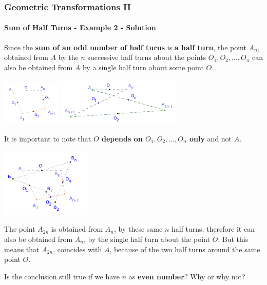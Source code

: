 \documentclass[8pt,xcolor=table,dvipsnames]{beamer}
\begin{document}
\begin{frame}[t]
    \frametitle{Geometric Transformations II}
    \framesubtitle{Sum of Half Turns - Example 2 - Solution}
    Since the \textbf{sum of an odd number of half turns} is \textbf{a half turn}, the point $A_n$, obtained from $A$ by the $n$
    successive half turns about the points $O_1, O_2, \ldots, O_{n}$ can also be obtained from $A$ by a single half turn about some point $O$.
    \begin{center}
        \includegraphics[width=2.8cm]{./svg/pdf/translation-2b.pdf}
        \qquad \qquad
        \includegraphics[width=6cm]{./svg/pdf/translation-2d.pdf}
    \end{center}
    It is important to note that \textbf{$O$ depends on $O_1, O_2, \ldots, O_{n}$ only} and not $A$.
    \begin{center}
        \includegraphics[width=4.3cm]{./svg/pdf/translation-2c.pdf}
    \end{center}
    The point $A_{2n}$ is obtained from $A_n$, by these same $n$ half turns;
    therefore it can also be obtained from $A_n$, by the single half turn about the point $O$.
    But this means that $A_{2n}$, coincides with $A$, because of the two half turns around the same point $O$.
    
    Is the conclusion still true if we have $n$ as \textbf{even number}? Why or why not?
\end{frame}
\end{document}
